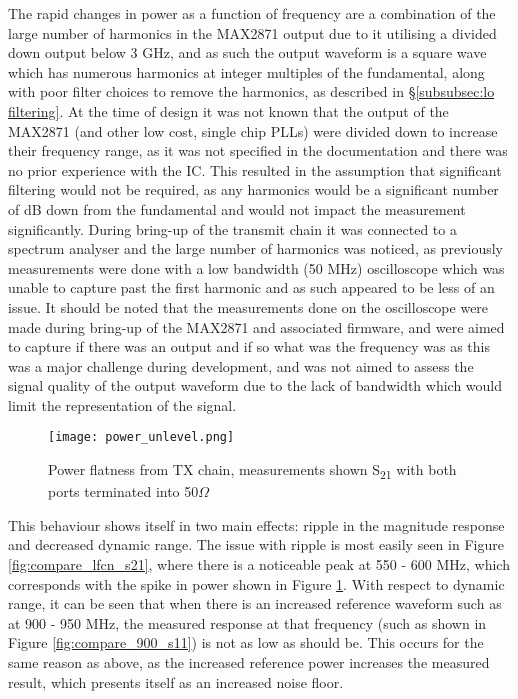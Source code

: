 The rapid changes in power as a function of frequency are a combination of the large number of harmonics in the MAX2871 output due to it utilising a divided down output below 3 GHz, and as such the output waveform is a square wave which has numerous harmonics at integer multiples of the fundamental, along with poor filter choices to remove the harmonics, as described in \S \ref{subsubsec:lo filtering}. At the time of design it was not known that the output of the MAX2871 (and other low cost, single chip PLLs) were divided down to increase their frequency range, as it was not specified in the documentation and there was no prior experience with the IC. This resulted in the assumption that significant filtering would not be required, as any harmonics would be a significant number of dB down from the fundamental and would not impact the measurement significantly. During bring-up of the transmit chain it was connected to a spectrum analyser and the large number of harmonics was noticed, as previously measurements were done with a low bandwidth (50 MHz) oscilloscope which was unable to capture past the first harmonic and as such appeared to be less of an issue. It should be noted that the measurements done on the oscilloscope were made during bring-up of the MAX2871 and associated firmware, and were aimed to capture if there was an output and if so what was the frequency was as this was a major challenge during development, and was not aimed to assess the signal quality of the output waveform due to the lack of bandwidth which would limit the representation of the signal. 

\begin{figure}[H]
	\centering
	\texttt{[image: power\_unlevel.png]}
	\caption{Power flatness from TX chain, measurements shown S\textsubscript{21} with both ports terminated into 50$\Omega$}
	\label{fig:power_unlevel}
\end{figure}

This behaviour shows itself in two main effects: ripple in the magnitude response and decreased dynamic range. The issue with ripple is most easily seen in Figure \ref{fig:compare_lfcn_s21}, where there is a noticeable peak at 550 - 600 MHz, which corresponds with the spike in power shown in Figure \ref{fig:power_unlevel}. With respect to dynamic range, it can be seen that when there is an increased reference waveform such as at 900 - 950 MHz, the measured response at that frequency (such as shown in Figure \ref{fig:compare_900_s11}) is not as low as should be. This occurs for the same reason as above, as the increased reference power increases the measured result, which presents itself as an increased noise floor.  


